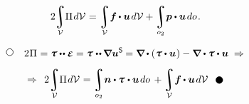 \nopagebreak\vspace{-0.1em}\begin{equation}\label{clapeyron:elasticitytheorem}
2 \hspace{-0.2em}
\integral\displaylimits_{\mathcal{V}} \hspace{-0.5ex} \Pi \hspace{0.2ex} d\mathcal{V} \hspace{.12ex} =
\integral\displaylimits_{\mathcal{V}} \hspace{-0.4ex} \bm{f} \hspace{-0.1ex} \dotp \bm{u} \hspace{0.25ex} d\mathcal{V} +
\integral\displaylimits_{o_2} \hspace{-0.4ex} \bm{p} \dotp \bm{u} \hspace{0.25ex} do \hspace{0.2ex} .
\end{equation}

\vspace{-0.55em}\begin{multline*}
\tikz[baseline=-1ex] \draw [line width=.5pt, color=black, fill=white] (0, 0) circle (.8ex);
\hspace{2.5ex}
2 \hspace{0.1ex} \Pi \hspace{0.1ex} = \mathboldtau \dotdotp \mathboldepsilon =
\mathboldtau \hspace{0.1ex} \dotdotp \hspace{-0.12ex} \boldnabla \bm{u}^{\mathsf{S}} \hspace{-0.12ex} =
\boldnabla \hspace{-0.1ex} \dotp \left( \hspace{0.1ex} \mathboldtau \dotp \bm{u} \hspace{0.1ex} \right) -
\tikzmark{beginMinusLoad} \boldnabla \dotp \mathboldtau \tikzmark{endMinusLoad} \dotp \bm{u} \;\Rightarrow \\[.5em]
\Rightarrow\;\,
\displaystyle 2 \hspace{-0.16em}
\integral\displaylimits_{\mathcal{V}} \hspace{-0.5ex} \Pi \hspace{0.2ex} d\mathcal{V} \hspace{.12ex} =
\integral\displaylimits_{o_2} \hspace{-0.4ex} \tikzmark{beginSurfaceLoad} \bm{n} \dotp \mathboldtau \tikzmark{endSurfaceLoad} \hspace{0.1ex} \dotp \bm{u} \hspace{0.25ex} do \hspace{.4ex} +
\integral\displaylimits_{\mathcal{V}} \hspace{-0.4ex} \bm{f} \hspace{-0.1ex} \dotp \bm{u} \hspace{0.25ex} d\mathcal{V}
\hspace{1.8ex}
\tikz[baseline=-0.6ex] \draw [color=black, fill=black] (0, 0) circle (.8ex);
\end{multline*}%
%

